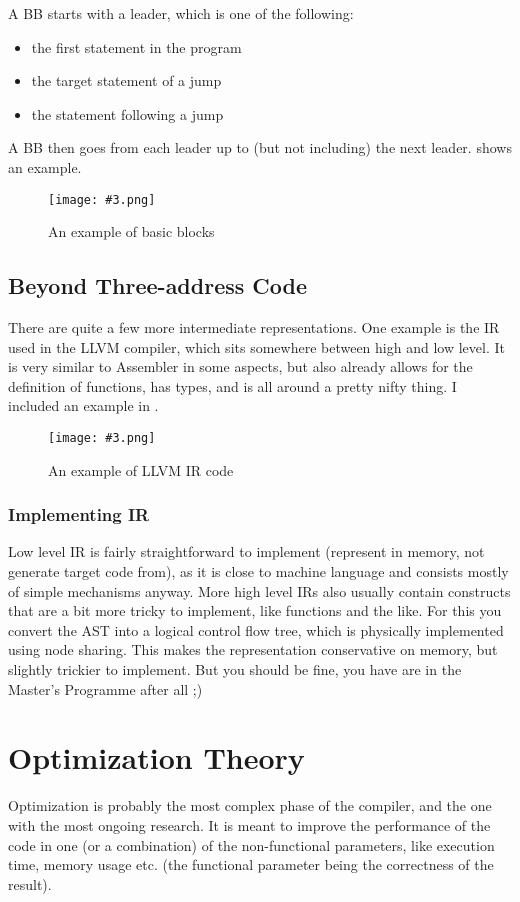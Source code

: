 \documentclass{article}
\newcommand{\fig}[4]{
	\begin{figure}[#1]
		\center
		\texttt{[image: \#3.png]}
		\caption{#4}
		\label{fig:#3}
	\end{figure}
	}
\begin{document}
A BB starts with a leader, which is one of the following:
\begin{itemize}
	\item the first statement in the program
	\item the target statement of a jump
	\item the statement following a jump
\end{itemize}
A BB then goes from each leader up to (but not including) the next leader.
 shows an example.

\fig{h}{}{bbs}{An example of basic blocks}

\subsection{Beyond Three-address Code}
There are quite a few more intermediate representations.
One example is the IR used in the LLVM compiler, which sits somewhere between high and low level.
It is very similar to Assembler in some aspects, but also already allows for the definition of functions, has types, and is all around a pretty nifty thing.
I included an example in .

\fig{h}{}{llvm}{An example of LLVM IR code}

\subsubsection{Implementing IR}
Low level IR is fairly straightforward to implement (represent in memory, not generate target code from), as it is close to machine language and consists mostly of simple mechanisms anyway.
More high level IRs also usually contain constructs that are a bit more tricky to implement, like functions and the like.
For this you convert the AST into a logical control flow tree, which is physically implemented using node sharing.
This makes the representation conservative on memory, but slightly trickier to implement.
But you should be fine, you have are in the Master's Programme after all ;)

\section{Optimization Theory}
Optimization is probably the most complex phase of the compiler, and the one with the most ongoing research.
It is meant to improve the performance of the code in one (or a combination) of the non-functional parameters, like execution time, memory usage etc. (the functional parameter being the correctness of the result).
\end{document}
